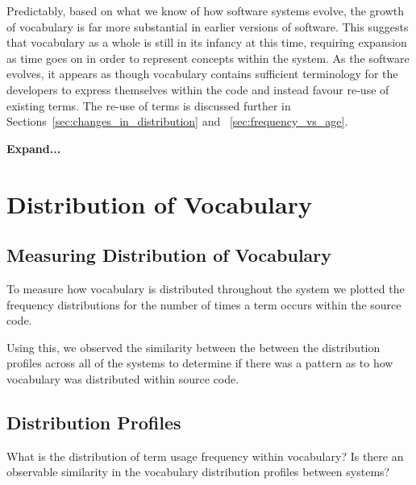 Predictably, based on what we know of how software systems evolve, the growth of vocabulary is far more substantial in earlier versions of software. This suggests that vocabulary as a whole is still in its infancy at this time, requiring expansion as time goes on in order to represent concepts within the system. As the software evolves, it appears as though vocabulary contains sufficient terminology for the developers to express themselves within the code and instead favour re-use of existing terms. The re-use of terms is discussed further in Sections~\ref{sec:changes_in_distribution} and ~\ref{sec:frequency_vs_age}.

\textbf{Expand...}

\section{Distribution of Vocabulary} %
\label{sec:distribution_of_vocabulary}

\subsection{Measuring Distribution of Vocabulary} %
\label{sub:measuring_distribution_of_vocabulary}

To measure how vocabulary is distributed throughout the system we plotted the frequency distributions for the number of times a term occurs within the source code.

Using this, we observed the similarity between the between the distribution profiles across all of the systems to determine if there was a pattern as to how vocabulary was distributed within source code.


\subsection{Distribution Profiles} %
\label{sub:distribution_profiles}

What is the distribution of term usage frequency within vocabulary? Is there an observable similarity in the vocabulary distribution profiles between systems?


